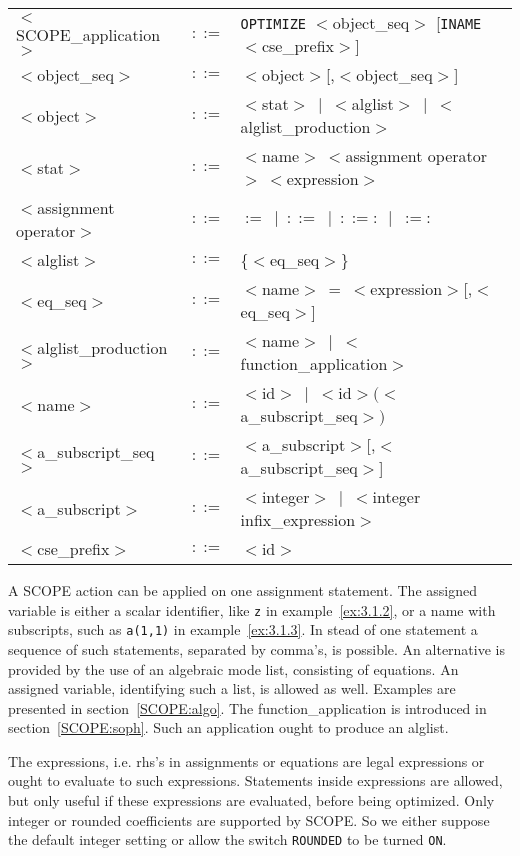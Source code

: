 \begin{center}
\begin{tabular}{lcl}
 $<$SCOPE\_application$>$ & $::=$ & {\tt OPTIMIZE} $<$object\_seq$>$
 [{\tt INAME} $<$cse\_prefix$>$]\\
 $<$object\_seq$>$ & $::=$ & $<$object$>$[,$<$object\_seq$>$]\\
 $<$object$>$ & $::=$ & $<$stat$>~\mid~<$alglist$>~\mid~<$alglist\_production$>$ \\
 $<$stat$>$ & $::=$ & $<$name$>~<$assignment operator$>~<$expression$>$\\
 $<$assignment operator$>$ & $::=$ & $:=~\mid~::=~\mid~::=:~\mid~:=:$\\
 $<$alglist$>$ & $::=$ & \{$<$eq\_seq$>$\}\\
 $<$eq\_seq$>$ & $::=$ & $<$name$>~=~<$expression$>$[,$<$eq\_seq$>$]\\
 $<$alglist\_production$>$ & $::=$ & $<$name$>~\mid~<$function\_application$>$\\
 $<$name$>$ & $::=$ & $<$id$>~\mid~<$id$>(<$a\_subscript\_seq$>)$\\
 $<$a\_subscript\_seq$>$ & $::=$ & $<$a\_subscript$>$[,$<$a\_subscript\_seq$>$]\\
 $<$a\_subscript$>$ & $::=$ & $<$integer$>~\mid~<$integer infix\_expression$>$\\
 $<$cse\_prefix$>$ & $::=$ & $<$id$>$
\end{tabular}
\end{center}

A SCOPE action can be applied on one assignment statement. 
The assigned variable
is either a scalar identifier, like {\tt z} in example~\ref{ex:3.1.2}, or a 
name with subscripts, such as {\tt a(1,1)} in example~\ref{ex:3.1.3}. 
In stead of one
statement a sequence of such statements, separated by comma's, is possible.
An alternative is provided by the use of an algebraic mode list, consisting
of {\REDUCE} equations. An assigned variable, identifying such a list, is 
allowed as well. Examples are presented in section~\ref{SCOPE:algo}.
The function\_application is introduced in section~\ref{SCOPE:soph}. Such an 
application ought to produce an alglist.

The expressions, i.e. rhs's in assignments or equations are legal {\REDUCE}
expressions or ought to evaluate to such expressions. Statements inside 
expressions are allowed, but only useful if these expressions are evaluated,
before being optimized. Only integer or rounded coefficients are supported
by SCOPE. So we either suppose the default integer setting or allow the switch
{\tt ROUNDED} to be turned {\tt ON}.

